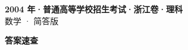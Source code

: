 \documentclass[zihao=-4, a4paper]{ctexart}
\begin{document}
\begin{center}
  {\Large\bfseries 2004 年·普通高等学校招生考试·浙江卷·理科}\\[4pt]
  {\large 数学 · 简答版}
\end{center}
\medskip
{}

\clearpage
{}
\begin{center}{\Large\bfseries 答案速查}\end{center}
\medskip

\end{document}
